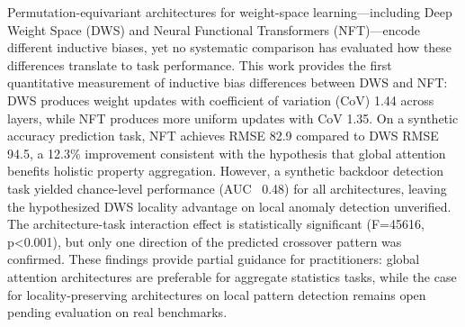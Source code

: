 
Permutation-equivariant architectures for weight-space learning---including Deep Weight Space (DWS) and Neural Functional Transformers (NFT)---encode different inductive biases, yet no systematic comparison has evaluated how these differences translate to task performance. This work provides the first quantitative measurement of inductive bias differences between DWS and NFT: DWS produces weight updates with coefficient of variation (CoV) 1.44 across layers, while NFT produces more uniform updates with CoV 1.35. On a synthetic accuracy prediction task, NFT achieves RMSE 82.9 compared to DWS RMSE 94.5, a 12.3\% improvement consistent with the hypothesis that global attention benefits holistic property aggregation. However, a synthetic backdoor detection task yielded chance-level performance (AUC ~0.48) for all architectures, leaving the hypothesized DWS locality advantage on local anomaly detection unverified. The architecture-task interaction effect is statistically significant (F=45616, p<0.001), but only one direction of the predicted crossover pattern was confirmed. These findings provide partial guidance for practitioners: global attention architectures are preferable for aggregate statistics tasks, while the case for locality-preserving architectures on local pattern detection remains open pending evaluation on real benchmarks.
